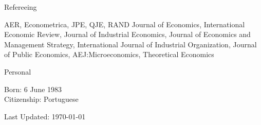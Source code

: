 \documentclass{resume}
\begin{document}




\begin{rSection}{Refereeing}

AER, Econometrica, JPE, QJE, RAND Journal of Economics, International Economic Review, Journal of Industrial Economics, Journal of Economics and Management Strategy, International Journal of Industrial Organization, Journal of Public Economics, AEJ:Microeconomics, Theoretical Economics
	
\end{rSection}


\newpage

\begin{rSection}{Personal}

Born: 6 June 1983
\\ Citizenship: Portuguese 

\end{rSection}


\begin{center}
\footnotesize{Last Updated: \today}	
\end{center}
\end{document}
